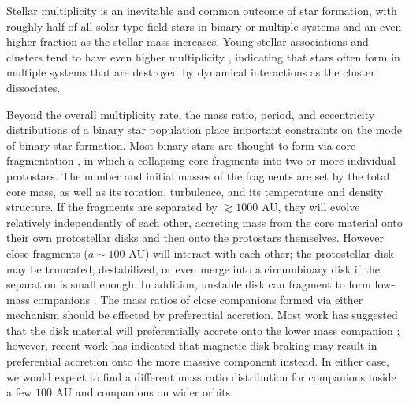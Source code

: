 \documentclass{emulateapj}
\begin{document}
Stellar multiplicity is an inevitable and common outcome of star formation, with roughly half of all solar-type field stars in binary or multiple systems \citep{Raghavan2010} and an even higher fraction as the stellar mass increases. Young stellar associations and clusters tend to have even higher multiplicity \citep{Duchene2013}, indicating that stars often form in multiple systems that are destroyed by dynamical interactions as the cluster dissociates. 

Beyond the overall multiplicity rate, the mass ratio, period, and eccentricity distributions of a binary star population place important constraints on the mode of binary star formation. Most binary stars are thought to form via core fragmentation \citep{Boss1979, Boss1986, Bate1995}, in which a collapsing core fragments into two or more individual protostars. The number and initial masses of the fragments are set by the total core mass, as well as its rotation, turbulence, and its temperature and density structure. If the fragments are separated by $\gtrsim 1000$ AU, they will evolve relatively independently of each other, accreting mass from the core material onto their own protostellar disks and then onto the protostars themselves. However close fragments ($a \sim 100$ AU) will interact with each other; the protostellar disk may be truncated, destabilized, or even merge into a circumbinary disk if the separation is small enough. In addition, unstable disk can fragment to form low-mass companions \citep{Kratter2006, Stammatellos2011}. The mass ratios of close companions formed via either mechanism should be effected by preferential accretion. Most work has suggested that the disk material will preferentially accrete onto the lower mass companion \citep{Bate1997, BBB2002}; however, recent work has indicated that magnetic disk braking may result in preferential accretion onto the more massive component \citep{Zhao2013} instead. In either case, we would expect to find a different mass ratio distribution for companions inside a few $100$ AU and companions on wider orbits.
\end{document}

